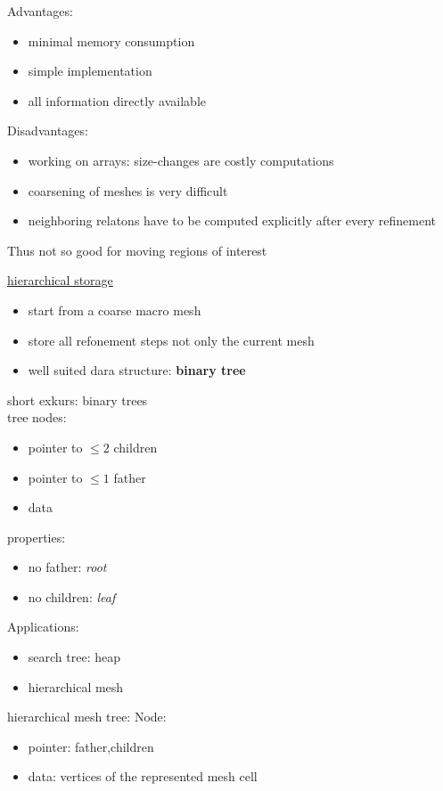 Advantages:
\begin{itemize}
	\item minimal memory consumption
	\item simple implementation
	\item all information directly available
\end{itemize}

Disadvantages:
\begin{itemize}
	\item working on arrays: size-changes are costly computations
	\item coarsening of meshes is very difficult
	\item neighboring relatons have to be computed explicitly after every refinement
\end{itemize}
Thus not so good for moving regions of interest

\underline{hierarchical storage}
\begin{itemize}
	\item start from a coarse \glqq macro mesh \grqq
	\item store all refonement steps not only the current mesh
	\item well suited dara structure: \textbf{binary tree}
\end{itemize}

short exkurs: binary trees\\
tree nodes:
\begin{itemize}
	\item pointer to $\leq 2$ children
	\item pointer to $\leq 1$ father
	\item data
\end{itemize}
properties:
\begin{itemize}
	\item no father: \textit{root}
	\item no children: \textit{leaf}
\end{itemize}

Applications:
\begin{itemize}
	\item search tree: heap
	\item hierarchical mesh
\end{itemize}

hierarchical mesh tree:
Node:
\begin{itemize}
	\item pointer: father,children
	\item data: vertices of the represented mesh cell
\end{itemize}


